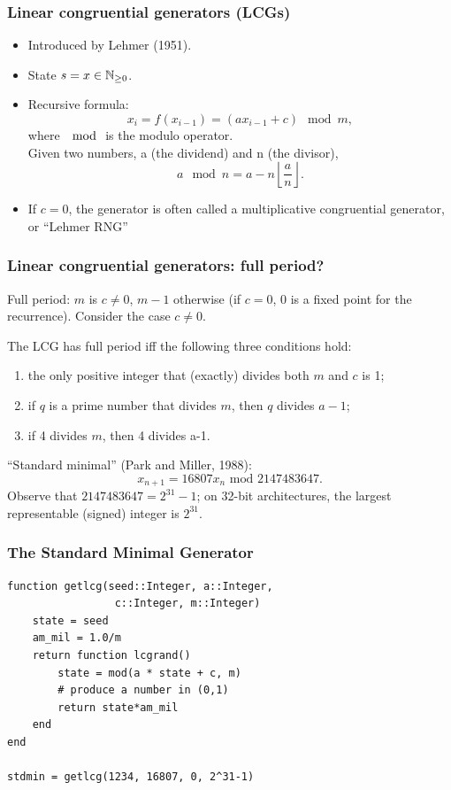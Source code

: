 \documentclass{beamer}
\begin{document}
	\begin{frame}
		\frametitle{Linear congruential generators (LCGs)}
		
\begin{itemize}
\item
Introduced by Lehmer (1951).
\item
State $s = x \in {\mathbb{N}}_{\geq 0}$.
\item
Recursive formula:
$$
x_i = f(x_{i-1}) = (ax_{i-1}+c) \mod m,
$$
where $\mod$ is the modulo operator.\\
Given two numbers, a (the dividend) and n (the divisor),
$$
a \mod n = a - n\left\lfloor \frac{a}{n} \right\rfloor.
$$
\item
If $c = 0$, the generator is often called a multiplicative congruential generator, or ``{\red Lehmer RNG}''
\end{itemize}
		
\end{frame}
	
	\begin{frame}
		\frametitle{Linear congruential generators: full period?}
		
		Full period: $m$ is $c \ne 0$, $m-1$ otherwise (if $c = 0$, 0 is a
		fixed point for the recurrence).
		Consider the case $c \ne 0$.
		
		\begin{theorem}[Period]
			The LCG has full period iff the
			following three conditions hold:
			\begin{enumerate}
				\item
				the only positive integer that (exactly) divides both $m$ and $c$ is
				1;
				\item
				if $q$ is a prime number that divides $m$, then $q$ divides $a-1$;
				\item
				if 4 divides $m$, then 4 divides a-1.
			\end{enumerate}
		\end{theorem}
		``{\red Standard minimal}'' (Park and Miller, 1988):
		\[
		x_{n+1} = 16807x_n \mbox{ mod } 2147483647.
		\]
		Observe that $2147483647 = 2^{31}-1$; on 32-bit architectures, the
		largest representable (signed) integer is $2^{31}$.
		
	\end{frame}
	
	\begin{frame}[containsverbatim]
		\frametitle{The Standard Minimal Generator}
		
		\begin{small}
			\begin{verbatim}
function getlcg(seed::Integer, a::Integer,
                 c::Integer, m::Integer)
    state = seed
    am_mil = 1.0/m
    return function lcgrand()
        state = mod(a * state + c, m)
        # produce a number in (0,1)
        return state*am_mil
    end
end

stdmin = getlcg(1234, 16807, 0, 2^31-1)
		\end{verbatim}
		\end{small}
		
	\end{frame}
	
\end{document}
